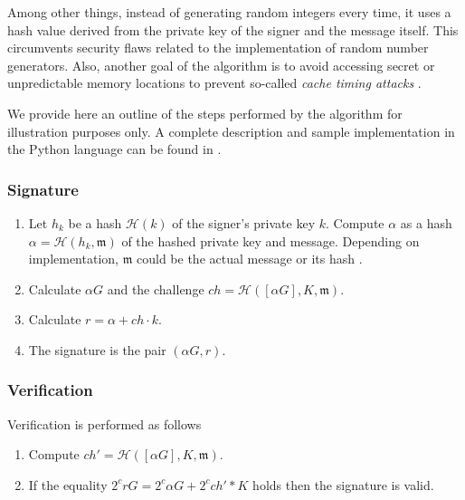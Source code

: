 Among other things, instead of generating random integers every time, it uses a hash value derived from the private key of the signer and the message itself. This circumvents security flaws related to the implementation of random number generators. Also, another goal of the algorithm is to avoid accessing secret or unpredictable memory locations to prevent so-called {\em cache timing attacks} \cite{Bernstein2012}.

We provide here an outline of the steps performed by the algorithm for illustration purposes only. A complete description and sample implementation in the Python language can be found in \cite{rfc8032}. 


\subsubsection{Signature}

\begin{enumerate}
	
	\item Let \(h_k\) be a hash \(\mathcal{H}(k)\) of the signer's private key \(k\). 
	Compute \(\alpha\) as a hash \(\alpha = \mathcal{H}(h_k, \mathfrak{m})\) of the hashed private key and message. Depending on implementation, $\mathfrak{m}$ could be the actual message or its hash \cite{rfc8032}.
	
	\item Calculate \(\alpha G\) and the challenge $ch = \mathcal{H}([\alpha G], K,  \mathfrak{m})$.

	\item Calculate \(r = \alpha + ch \cdot k \).
	
	\item The signature is the pair \((\alpha G, r)\).
\end{enumerate}


\subsubsection{Verification}
Verification is performed as follows

\begin{enumerate}
	
	\item Compute \(ch' = \mathcal{H}([\alpha G], K,  \mathfrak{m}) \).
	
	\item If the equality \(2^c r G = 2^c \alpha G + 2^c ch'*K \) holds then the signature is valid.
	
\end{enumerate}

